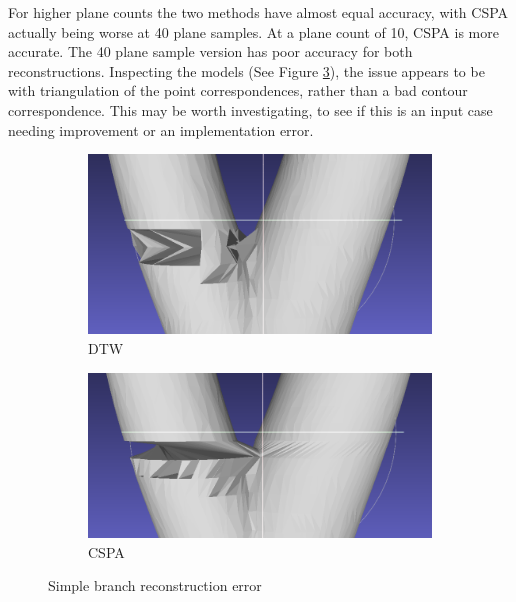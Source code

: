 \documentclass[11p, titlepage]{article}
\begin{document}
For higher plane counts the two methods have almost equal accuracy, with CSPA actually being worse at 40 plane samples. At a plane count of 10, CSPA is more accurate. The 40 plane sample version has poor accuracy for both reconstructions. Inspecting the models (See Figure \ref{fig:simple_branch_40}), the issue appears to be with triangulation of the point correspondences, rather than a bad contour correspondence. This may be worth investigating, to see if this is an input case needing improvement or an implementation error.

\begin{figure}[h!]
     \centering
     \begin{subfigure}[b]{0.45\textwidth}
         \centering
         \includegraphics[width=\textwidth]{reconstructions/dtw-simple-branch-40}
         \caption{DTW}
         \label{fig:dtw_simple_branch_40}
     \end{subfigure}
     \hfill
     \begin{subfigure}[b]{0.45\textwidth}
         \centering
         \includegraphics[width=\textwidth]{reconstructions/cspa50-simple-branch-40}
         \caption{CSPA}
         \label{fig:cspa50_simple_branch_40}
     \end{subfigure}
        \caption{Simple branch reconstruction error}
        \label{fig:simple_branch_40}
\end{figure}
\end{document}

